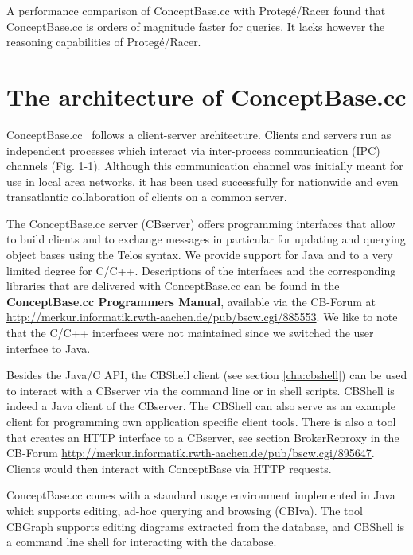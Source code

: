 A performance comparison \cite{Lud2010} of ConceptBase.cc with Proteg{\'e}/Racer found that 
ConceptBase.cc is orders of magnitude faster for queries. It lacks however the
reasoning capabilities of Proteg{\'e}/Racer.

\section{The architecture of ConceptBase.cc}
\label{sec:architecture}

ConceptBase.cc \relnr\ follows a client-server architecture. Clients and servers
run as independent processes which interact via inter-process communication
(IPC) channels (Fig. 1-1).  Although this communication channel was
initially meant for use in local area networks, it has been used
successfully for nationwide and even transatlantic collaboration of clients
on a common server.

The ConceptBase.cc server (CBserver) offers programming interfaces that allow to build
clients and to exchange messages in particular for updating and querying
object bases using the Telos syntax. We provide support for Java and to a very limited
degree for C/C++. 
Descriptions of the interfaces and the corresponding
libraries that are delivered with ConceptBase.cc can be found in the {\bfseries
ConceptBase.cc Programmers Manual}, available via the CB-Forum at
\url{http://merkur.informatik.rwth-aachen.de/pub/bscw.cgi/885553}.
We like to note that the C/C++ interfaces
were not maintained since we switched the user interface to Java. 

Besides the Java/C API,
the CBShell client (see section \ref{cha:cbshell}) can be used to interact with a CBserver
via the command line or in shell scripts. CBShell is indeed a Java client of the CBserver.
The CBShell can also serve as an example client for programming own application
specific client tools.
There is also a tool that creates an
HTTP interface to a CBserver, see section BrokerReproxy in the CB-Forum 
\url{http://merkur.informatik.rwth-aachen.de/pub/bscw.cgi/895647}. Clients would then
interact with ConceptBase via HTTP requests.





ConceptBase.cc comes with a standard usage environment
implemented in Java which supports editing, ad-hoc querying
and browsing (CBIva). The tool CBGraph supports editing diagrams extracted from
the database, and CBShell is a command line shell for interacting with the database.

